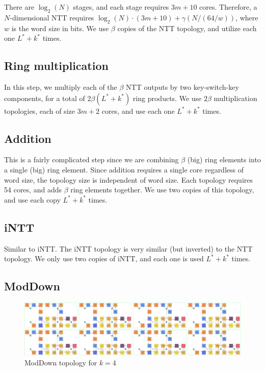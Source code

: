 \documentclass[../../fheimpl.tex]{subfiles}
\begin{document}
	There are $\log_2(N)$ stages, and each stage requires $3m+10$ cores. Therefore, a $N$-dimensional NTT requires $\log_2(N)\cdot(3m+10)+\gamma(N/(64/w))$, where $w$ is the word size in bits. We use $\beta$ copies of the NTT topology, and utilize each one $L^*+k^*$ times.
	
	\subsection{Ring multiplication}
	In this step, we multiply each of the $\beta$ NTT outputs by two key-switch-key components, for a total of $2\beta(L^*+k^*)$ ring products. We use $2\beta$ multiplication topologies, each of size $3m+2$ cores, and use each one $L^*+k^*$ times.
	
	\subsection{Addition}
	This is a fairly complicated step since we are combining $\beta$ (big) ring elements into a single (big) ring element. Since addition requires a single core regardless of word size, the topology size is independent of word size. Each topology requires 54 cores, and adds $\beta$ ring elements together. We use two copies of this topology, and use each copy $L^*+k^*$ times.
	
	\subsection{iNTT}
	Similar to iNTT. The iNTT topology is very similar (but inverted) to the NTT topology. We only use two copies of iNTT, and each one is used $L^*+k^*$ times.
	
	\subsection{ModDown}
	\begin{figure}[h]
		\includegraphics[width=\textwidth,height=\textheight,keepaspectratio]{graphics/moddown.png}
		\caption{ModDown topology for $k=4$}
		\label{fig:moddowntopo}
	\end{figure}
	
	
	
	\ifimplismain
	\else
	\printbibliography
	\fi
	
\end{document}
